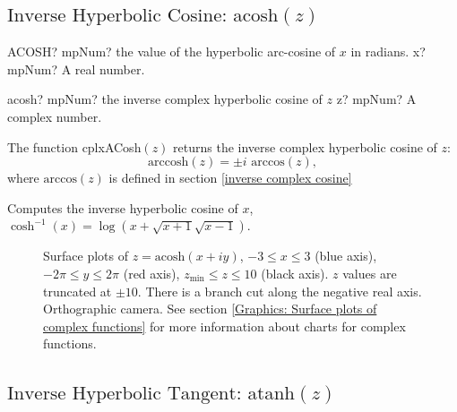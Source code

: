 \newpage
\subsection{\texorpdfstring{$\text{Inverse Hyperbolic Cosine: acosh}(z)$}{acosh}}

\begin{mpFunctionsExtract}
	\mpWorksheetFunctionOneNotImplemented
	{ACOSH? mpNum? the value of the hyperbolic arc-cosine  of $x$ in radians.}
	{x? mpNum? A real number.}
\end{mpFunctionsExtract}

\vspace{0.6cm}


\begin{mpFunctionsExtract}
	\mpFunctionOne
	{acosh? mpNum? the inverse complex hyperbolic cosine of $z$}
	{z? mpNum? A complex number.}
\end{mpFunctionsExtract}

\vspace{0.3cm}
The function \textsf{cplxACosh$(z)$} returns the inverse complex hyperbolic cosine of $z$: 
\begin{equation}
	\text{arccosh}(z) = \pm i \text{ arccos}(z),
\end{equation}
where $\text{arccos}(z)$ is defined in section \ref{inverse complex cosine}

Computes the inverse hyperbolic cosine of $x$, $\cosh^{-1}(x)=\log(x+\sqrt{x+1}\sqrt{x-1})$.

\begin{figure}[ht]%
	\centering
	\qquad
	\caption[Complex Inverse Hyperbolic Cosine]{Surface plots of $z = \text{acosh}(x + iy)$, $-3 \leq x \leq 3$ (blue axis), $-2 \pi \leq y \leq 2\pi$ (red axis), $z_{\text{min}} \leq z \leq 10$ (black axis). $z$ values are truncated at $\pm 10$. There is a branch cut along the negative real axis. Orthographic camera. See section \ref{Graphics: Surface plots of complex functions} for more information about charts for complex functions.} 
	\label{fig:Complex Inverse Hyperbolic Cosine}%
\end{figure}


\newpage
\subsection{\texorpdfstring{$\text{Inverse Hyperbolic Tangent: atanh}(z)$}{atanh}}


